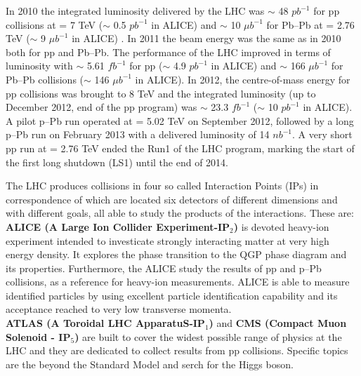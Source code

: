 In 2010 the integrated luminosity delivered by the LHC was $\sim$ 48 $pb^{-1}$ for pp collisions at \s = 7 TeV ($\sim$ 0.5 $pb^{-1}$ in ALICE) and $\sim$ 10 $\mu b^{-1}$ for Pb--Pb at \snn = 2.76 TeV ($\sim$ 9 $\mu b^{-1}$ in ALICE) \cite{cite:ALICEPerformance}. In 2011 the beam energy was the same as in 2010 both for pp and Pb--Pb. The performance of the LHC improved in terms of luminosity with $\sim$ 5.61 $fb^{-1}$ for pp ($\sim$ 4.9 $pb^{-1}$ in ALICE) and $\sim$ 166 $\mu b^{-1}$ for Pb--Pb collisions ($\sim$ 146 $\mu b^{-1}$ in ALICE). In 2012, the centre-of-mass energy for pp collisions was brought to 8 TeV and the integrated luminosity (up to December 2012, end of the pp program) was $\sim$ 23.3 $fb^{-1}$ ($\sim$ 10 $pb^{-1}$ in ALICE). A pilot p--Pb run operated at \snn = 5.02 TeV on September 2012, followed by a long p--Pb run on February 2013 with a delivered luminosity of 14 $nb^{-1}$. A very short pp run at \s = 2.76 TeV ended the Run1 of the LHC program, marking the start of the first long shutdown (LS1) until the end of 2014. %

The LHC produces collisions in four so called Interaction Points (IPs) in correspondence of which are located six detectors of different dimensions and with different goals, all able to study the products of the interactions. These are: \\

\textbf{ALICE (A Large Ion Collider Experiment-IP$_{2}$)} \cite{cite:proposalALICE} is devoted heavy-ion experiment intended to investicate strongly interacting matter at very high energy density. It explores the phase transition to the QGP phase diagram and its properties. Furthermore, the ALICE study the results of pp and p--Pb collisions, as a reference for heavy-ion measurements. ALICE is able to measure identified particles by using excellent particle identification capability and its acceptance reached to very low transverse momenta. \\

\textbf{ATLAS (A Toroidal LHC ApparatuS-IP$_{1}$)} and \textbf{CMS (Compact Muon Solenoid - IP$_{5}$) }\cite{cite:proposalATLAS}\cite{cite:proposalCMS} are built to cover the widest possible range of physics at the LHC and they are dedicated to collect results from pp collisions.  Specific topics are the beyond the Standard Model and serch for the Higgs boson. \\

